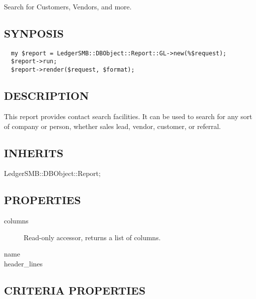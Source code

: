 \begin{description}
\begin{description}
\begin{description}
\begin{description}
\begin{description}
\begin{description}
\begin{description}
\begin{description}
\begin{description}
\begin{description}
Search for Customers, Vendors,
and more.

\subsection*{SYNPOSIS\label{LedgerSMB::DBObject::Report::Contact::Search_SYNPOSIS}}
\begin{verbatim}
  my $report = LedgerSMB::DBObject::Report::GL->new(%$request);
  $report->run;
  $report->render($request, $format);
\end{verbatim}
\subsection*{DESCRIPTION\label{LedgerSMB::DBObject::Report::Contact::Search_DESCRIPTION}}


This report provides contact search facilities.  It can be used to search for
any sort of company or person, whether sales lead, vendor, customer, or
referral.

\subsection*{INHERITS\label{LedgerSMB::DBObject::Report::Contact::Search_INHERITS}}
\begin{description}

\item[{LedgerSMB::DBObject::Report;}] \mbox{}\end{description}
\subsection*{PROPERTIES\label{LedgerSMB::DBObject::Report::Contact::Search_PROPERTIES}}
\begin{description}

\item[{columns}] \mbox{}

Read-only accessor, returns a list of columns.


\item[{name}] \mbox{}
\item[{header\_lines}] \mbox{}\end{description}
\subsection*{CRITERIA PROPERTIES\label{LedgerSMB::DBObject::Report::Contact::Search_CRITERIA_PROPERTIES}}
\begin{description}


\end{description}
\end{description}
\end{description}
\end{description}
\end{description}
\end{description}
\end{description}
\end{description}
\end{description}
\end{description}
\end{description}
